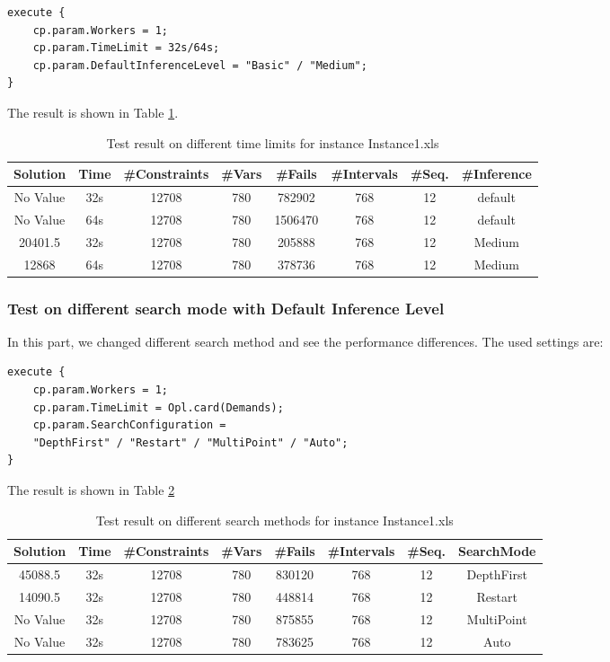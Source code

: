 \documentclass[a4paper, 12pt]{article}
\begin{document}
\begin{lstlisting}
execute {
    cp.param.Workers = 1;
    cp.param.TimeLimit = 32s/64s; 
    cp.param.DefaultInferenceLevel = "Basic" / "Medium";
}
\end{lstlisting}

The result is shown in Table \ref{diffTime2}.
\begin{table}
    \centering
    \caption{Test result on different time limits for instance Instance1.xls}
    \label{diffTime2}
    \begin{tabular}{|c|c|c|c|c|c|c|c|}
        \hline
        Solution & Time & \#Constraints & \#Vars & \#Fails & \#Intervals & \#Seq. & \#Inference \\
        \hline
        No Value & 32s & 12708 & 780 & 782902 & 768 & 12 & default \\
        \hline 
        No Value & 64s & 12708 & 780 & 1506470 & 768 & 12 & default \\
        \hline
        20401.5 & 32s & 12708 & 780 & 205888 & 768 & 12 & Medium \\
        \hline 
        12868 & 64s & 12708 & 780 & 378736 & 768 & 12 & Medium \\
        \hline 
    \end{tabular}
\end{table}

\subsubsection{Test on different search mode with Default Inference Level}

In this part, we changed different search method and see the performance differences. The used settings are: 

\begin{lstlisting}
execute {
    cp.param.Workers = 1;
    cp.param.TimeLimit = Opl.card(Demands); 
    cp.param.SearchConfiguration = 
    "DepthFirst" / "Restart" / "MultiPoint" / "Auto";
}
\end{lstlisting}

The result is shown in Table \ref{diffSear2}

\begin{table}
    \centering
    \caption{Test result on different search methods for instance Instance1.xls}
    \label{diffSear2}
    \begin{tabular}{|c|c|c|c|c|c|c|c|}
        \hline
        Solution & Time & \#Constraints & \#Vars & \#Fails & \#Intervals & \#Seq. & SearchMode \\
        \hline
        45088.5 & 32s & 12708 & 780 & 830120 & 768 & 12 & DepthFirst \\
        \hline 
        14090.5 & 32s & 12708 & 780 & 448814 & 768 & 12 & Restart \\
        \hline
        No Value & 32s & 12708 & 780 & 875855 & 768 & 12 & MultiPoint \\
        \hline
        No Value & 32s & 12708 & 780 & 783625 & 768 & 12 & Auto \\
        \hline
    \end{tabular}
\end{table}
\end{document}
